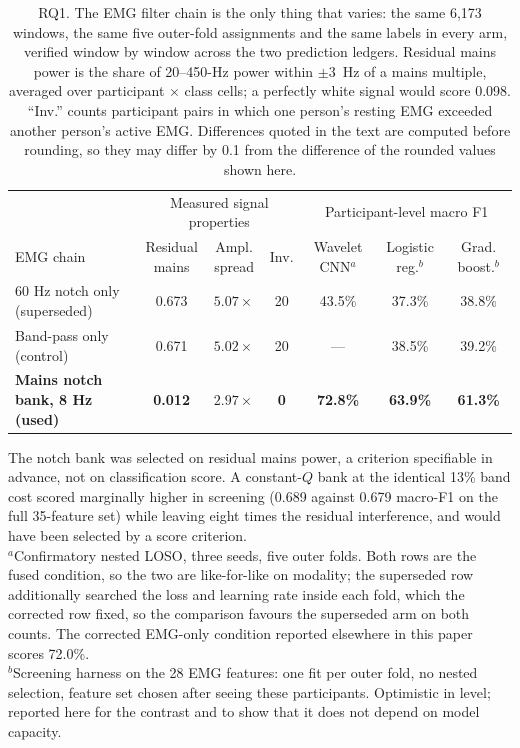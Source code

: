 \documentclass[pdflatex,sn-nature,iicol]{sn-jnl}
\begin{document}
\begin{table}[t]
  \centering
  \caption{RQ1. The EMG filter chain is the only thing that varies: the same 6,173 windows, the same five outer-fold assignments and the same labels in every arm, verified window by window across the two prediction ledgers. Residual mains power is the share of 20--450-Hz power within $\pm3$~Hz of a mains multiple, averaged over participant $\times$ class cells; a perfectly white signal would score 0.098. ``Inv.'' counts participant pairs in which one person's resting EMG exceeded another person's active EMG. Differences quoted in the text are computed before rounding, so they may differ by 0.1 from the difference of the rounded values shown here.}
  \label{tab:filter}
  \footnotesize
  \begin{tabular*}{\textwidth}{@{\extracolsep{\fill}}lcccccc@{}}
    \toprule
    & \multicolumn{3}{c}{Measured signal properties} & \multicolumn{3}{c}{Participant-level macro F1} \\
    \cmidrule(lr){2-4}\cmidrule(lr){5-7}
    EMG chain & \shortstack{Residual\\mains} & \shortstack{Ampl.\\spread} & Inv. & \shortstack{Wavelet\\CNN$^{a}$} & \shortstack{Logistic\\reg.$^{b}$} & \shortstack{Grad.\\boost.$^{b}$} \\
    \midrule
    60 Hz notch only (superseded) & 0.673 & $5.07\times$ & 20 & 43.5\% & 37.3\% & 38.8\% \\
    Band-pass only (control) & 0.671 & $5.02\times$ & 20 & --- & 38.5\% & 39.2\% \\
    \midrule
    \textbf{Mains notch bank, 8 Hz (used)} & \textbf{0.012} & $\mathbf{2.97\times}$ & \textbf{0} & \textbf{72.8\%} & \textbf{63.9\%} & \textbf{61.3\%} \\
    \bottomrule
  \end{tabular*}
  \begin{flushleft}\footnotesize
  The notch bank was selected on residual mains power, a criterion specifiable in advance, not on classification score. A constant-$Q$ bank at the identical 13\% band cost scored marginally higher in screening (0.689 against 0.679 macro-F1 on the full 35-feature set) while leaving eight times the residual interference, and would have been selected by a score criterion.\\
  $^{a}$Confirmatory nested LOSO, three seeds, five outer folds. Both rows are the fused condition, so the two are like-for-like on modality; the superseded row additionally searched the loss and learning rate inside each fold, which the corrected row fixed, so the comparison favours the superseded arm on both counts. The corrected EMG-only condition reported elsewhere in this paper scores 72.0\%.\\
  $^{b}$Screening harness on the 28 EMG features: one fit per outer fold, no nested selection, feature set chosen after seeing these participants. Optimistic in level; reported here for the contrast and to show that it does not depend on model capacity.
  \end{flushleft}
\end{table}
\end{document}
